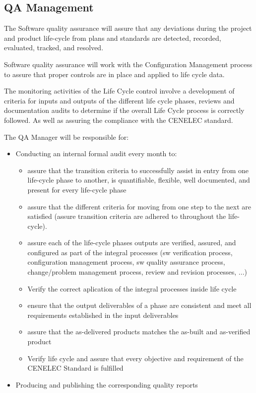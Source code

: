 \documentclass{template/openetcs_article}
\begin{document}
\subsection{QA Management }
The Software quality assurance will assure that any deviations during the project and product life-cycle from plans and standards are detected, recorded, evaluated, tracked, and resolved.

Software quality assurance will work with the Configuration Management process to assure that proper controls are in place and applied to life cycle data.

The monitoring activities of the Life Cycle control involve a development of criteria for inputs and outputs of the different life cycle phases, reviews and documentation audits to determine if the overall Life Cycle process is correctly followed. As well as assuring the compliance with the CENELEC standard.

The QA Manager will be responsible for:
\begin{itemize}
\item Conducting an internal formal audit every month to:
\begin{itemize}
\item assure that the transition criteria to successfully assist in entry from one life-cycle phase to another, is quantifiable, flexible, well documented, and present for every life-cycle phase
\item assure that the different criteria for moving from one step to the next are satisfied (assure transition criteria are adhered to throughout the life-cycle).
\item assure each of the life-cycle phases outputs
are verified, assured, and configured as part of the integral processes (sw verification process, configuration management process, sw quality assurance process, change/problem management process, review and revision processes, ...)
\item Verify the correct aplication of the integral processes inside life cycle
\item ensure that the output deliverables of a phase are consistent and meet all requirements established in the input deliverables
\item assure that the as-delivered products matches the as-built and as-verified product
\item Verify life cycle and assure that every objective and requirement of the CENELEC Standard is fulfilled
\end{itemize}
\item Producing and publishing the corresponding quality reports
\end{itemize}
\end{document}
